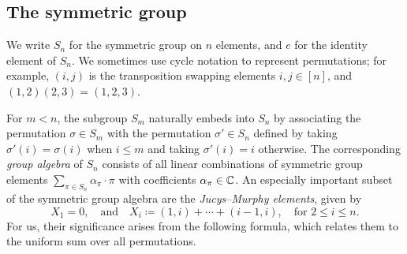 \documentclass{article}
\begin{document}
\subsection{The symmetric group}
We write $S_n$ for the symmetric group on $n$ elements, and $e$ for the identity element of $S_n$.
We sometimes use cycle notation to represent permutations; for example, $(i, j)$ is the transposition swapping elements $i, j \in [n]$, and $(1, 2) (2, 3) =  (1, 2, 3)$.

For $m < n$, the subgroup $S_{m}$ naturally embeds into $S_n$ by associating the permutation $\sigma \in S_{m}$ with the permutation $\sigma' \in S_n$ defined by taking $\sigma'(i) = \sigma(i)$ when $i \leq m$ and taking $\sigma'(i) = i$ otherwise.
The corresponding \emph{group algebra} of $S_n$ consists of all linear combinations of symmetric group elements $\sum_{\pi \in S_n} \alpha_\pi \cdot \pi$ with coefficients $\alpha_\pi \in \mathbb C$.
An especially important subset of the symmetric group algebra are the \emph{Jucys--Murphy elements}, given by 
\begin{equation*}
    X_1 = 0, \quad \text{and} \quad X_i \coloneqq (1, i) + \cdots + (i-1, i), \quad \text{for $2 \leq i \leq n$}.
\end{equation*}
For us, their significance arises from the following formula,
which relates them to the uniform sum over all permutations.
\end{document}
